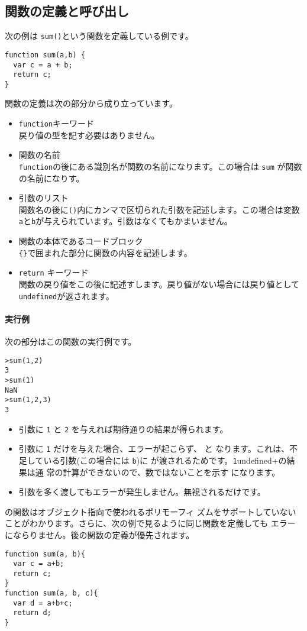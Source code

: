 \subsection{関数の定義と呼び出し}
次の例は \verb+sum()+という関数を定義している例です。
\begin{verbatim}
function sum(a,b) {
  var c = a + b;
  return c;
}
\end{verbatim}
関数の定義は次の部分から成り立っています。
\begin{itemize}
 \item \verb+function+キーワード\\
戻り値の型を記す必要はありません。
 \item 関数の名前\\
\verb+function+の後にある識別名が関数の名前になります。この場合は \verb+sum+
       が関数の名前になりす。
 \item 引数のリスト\\
関数名の後に\verb+()+内にカンマで区切られた引数を記述します。この場合は変数
       \verb+a+と\verb+b+が与えられています。引数はなくてもかまいません。
 \item 関数の本体であるコードブロック\\
\verb+{}+で囲まれた部分に関数の内容を記述します。
\item \verb+return+ キーワード\\
関数の戻り値をこの後に記述すします。戻り値がない場合には戻り値として
       \verb+undefined+が返されます。
\end{itemize}
\paragraph{実行例}
次の部分はこの関数の実行例です。
\begin{verbatim}
>sum(1,2)
3
>sum(1)
NaN
>sum(1,2,3)
3
\end{verbatim} 
\begin{itemize}
 \item 引数に \verb+1+ と \verb+2+ を与えれば期待通りの結果が得られます。
 \item 引数に \verb+1+ だけを与えた場合、エラーが起こらず、 と
       なります。これは、不足している引数(この場合には \verb+b+)に
        が渡されるためです。\verb+1+undefined+の結果は通
       常の計算ができないので、数ではないことを示す になります。
 \item 引数を多く渡してもエラーが発生しません。無視されるだけです。
\end{itemize}
\JS の関数はオブジェクト指向で使われるポリモーフィ
ズムをサポートしていないことがわかります。さらに、次の例で見るように同じ関数を定義しても
エラーにならりません。後の関数の定義が優先されます。
\begin{verbatim}
function sum(a, b){
  var c = a+b;
  return c;
}
function sum(a, b, c){
  var d = a+b+c;
  return d;
}
\end{verbatim}
